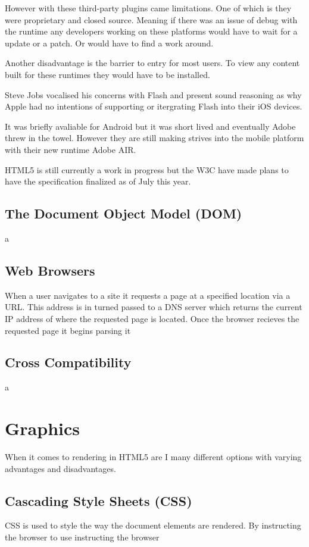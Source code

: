 \documentclass[final]{cmpreport}
\begin{document}
However with these third-party plugins came limitations. One of which is they were proprietary and closed source. Meaning if there was an issue of debug with the runtime any developers working on these platforms would have to wait for a update or a patch. Or would have to find a work around.

Another disadvantage is the barrier to entry for most users. To view any content built for these runtimes they would have to be installed. 

Steve Jobs vocalised his concerns with Flash and present sound reasoning as why Apple had no intentions of supporting or itergrating Flash into their iOS devices.

It was briefly avaliable for Android but it was short lived and eventually Adobe threw in the towel. However they are still making strives into the mobile platform with their new runtime Adobe AIR.

HTML5 is still currently a work in progress but the W3C have made plans to have the specification finalized as of July this year.

\subsection{The Document Object Model (DOM)}
a

\subsection{Web Browsers}
When a user navigates to a site it requests a page at a specified location via a URL. This address is in turned passed to a DNS server which returns the current IP address of where the requested page is located. Once the browser recieves the requested page it begins parsing it

\subsection{Cross Compatibility}
a

\section{Graphics}
When it comes to rendering in HTML5 are I many different options with varying advantages and disadvantages.

\subsection{Cascading Style Sheets (CSS)}
CSS is used to style the way the document elements are rendered. By instructing the browser to use  instructing the browser
\end{document}
